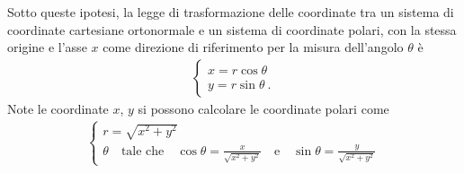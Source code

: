 \documentclass[letterpaper,10pt,italian]{jupyterBook}
\begin{document}
\sphinxAtStartPar
Sotto queste ipotesi, la legge di trasformazione delle coordinate tra un sistema di coordinate cartesiane ortonormale e un sistema di coordinate polari, con la stessa origine e l’asse \(x\) come direzione di riferimento per la misura dell’angolo \(\theta\) è
\begin{equation*}
\begin{split}\begin{cases}
  x = r \cos \theta \\
  y = r \sin \theta \ .
\end{cases}\end{split}
\end{equation*}
\sphinxAtStartPar
Note le coordinate \(x\), \(y\) si possono calcolare le coordinate polari come
\begin{equation}\label{equation:ch/analytic_geometry/analytic_geometry_2d/coordinates:eq:coords:cartesian-to-polar}
\begin{split}\begin{cases}
  r = \sqrt{x^2 + y^2} \\
  \theta \quad \text{tale che} \quad \cos \theta = \frac{x}{\sqrt{x^2+y^2}} \quad \text{e} \quad \sin \theta = \frac{y}{\sqrt{x^2+y^2}}
\end{cases}\end{split}
\end{equation}
\sphinxAtStartPar
{}
\label{ch/analytic_geometry/analytic_geometry_2d/coordinates:ex-coords-cartesian-polar}
\end{document}
